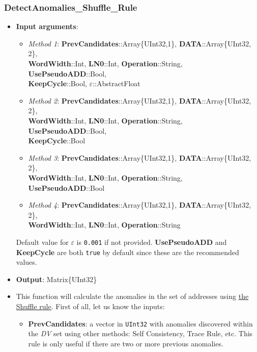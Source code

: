 \subsubsection*{DetectAnomalies\_Shuffle\_Rule}\label{Fun:DetectAnomaliesShuffleRule}
 \begin{itemize}
 	\item \textbf{Input arguments}: 
 		\begin{itemize}
		\item \textit{Method 1}:
			\textbf{PrevCandidates}::Array\{UInt32,1\}, \textbf{DATA}::Array\{UInt32, 2\}, \\ \textbf{WordWidth}::Int, \textbf{LN0}::Int,  \textbf{Operation}::String, \textbf{UsePseudoADD}::Bool, \\  \textbf{KeepCycle}::Bool, \textbf{\(\varepsilon\)}::AbstractFloat
		\item \textit{Method 2}: 			%
			\textbf{PrevCandidates}::Array\{UInt32,1\}, \textbf{DATA}::Array\{UInt32, 2\}, \\ \textbf{WordWidth}::Int, \textbf{LN0}::Int,  \textbf{Operation}::String, \textbf{UsePseudoADD}::Bool, \\ \textbf{KeepCycle}::Bool
		\item \textit{Method 3}: 			%
			\textbf{PrevCandidates}::Array\{UInt32,1\}, \textbf{DATA}::Array\{UInt32, 2\}, \\ \textbf{WordWidth}::Int, \textbf{LN0}::Int,  \textbf{Operation}::String, \textbf{UsePseudoADD}::Bool
			\item \textit{Method 4}: 			%
			\textbf{PrevCandidates}::Array\{UInt32,1\}, \textbf{DATA}::Array\{UInt32, 2\}, \\ \textbf{WordWidth}::Int, \textbf{LN0}::Int,  \textbf{Operation}::String			%
 		\end{itemize}
 		Default value for \textbf{\(\varepsilon\)} is \texttt{0.001} if not provided.  \textbf{UsePseudoADD} and \textbf{KeepCycle} are both \texttt{true} by default since these are the recommended values.
 		\item \textbf{Output}: Matrix\{UInt32\}
 		\item This function will calculate the anomalies in the set of addresses using \hyperref[Subsec:ShuffleRule]{the Shuffle rule}. 
 		First of all, let us know the inputs:
 		\begin{itemize}
 			
 			\item \textbf{PrevCandidates}: a vector in \texttt{UInt32} with anomalies discovered within the \textit{DV} set using other methods: Self Consistency, Trace Rule, etc. This rule is only useful if there are two or more previous anomalies. 
 			

\end{itemize}
\end{itemize}
